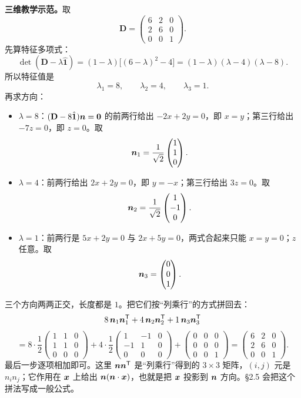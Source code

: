 \documentclass[11pt]{ctexart}
\newcommand{\ten}[1]{\mathbf{#1}}
\newcommand{\unitd}{\hat{\ten{1}}}
\begin{document}
\textbf{三维教学示范。}取
\[
\ten D=\begin{pmatrix}6&2&0\\2&6&0\\0&0&1\end{pmatrix}.
\]
先算特征多项式：
\[
\det(\ten D-\lambda\unitd)
=(1-\lambda)\bigl[(6-\lambda)^2-4\bigr]
=(1-\lambda)(\lambda-4)(\lambda-8).
\]
所以特征值是
\[
\lambda_1=8,\qquad \lambda_2=4,\qquad \lambda_3=1.
\]
再求方向：
\begin{itemize}[leftmargin=1.8em,itemsep=2pt]
\item $\lambda=8$：$(\ten D-8\unitd)\vect n=\vect0$ 的前两行给出 $-2x+2y=0$，即 $x=y$；第三行给出 $-7z=0$，即 $z=0$。取
\[
\boldsymbol{n}_1=\frac{1}{\sqrt2}\begin{pmatrix}1\\1\\0\end{pmatrix}.
\]
\item $\lambda=4$：前两行给出 $2x+2y=0$，即 $y=-x$；第三行给出 $3z=0$。取
\[
\boldsymbol{n}_2=\frac{1}{\sqrt2}\begin{pmatrix}1\\-1\\0\end{pmatrix}.
\]
\item $\lambda=1$：前两行是 $5x+2y=0$ 与 $2x+5y=0$，两式合起来只能 $x=y=0$；$z$ 任意。取
\[
\boldsymbol{n}_3=\begin{pmatrix}0\\0\\1\end{pmatrix}.
\]
\end{itemize}
三个方向两两正交，长度都是 $1$。把它们按“列乘行”的方式拼回去：
\[
8\,\boldsymbol{n}_1\boldsymbol{n}_1^{\mathsf T}
+4\,\boldsymbol{n}_2\boldsymbol{n}_2^{\mathsf T}
+1\,\boldsymbol{n}_3\boldsymbol{n}_3^{\mathsf T}
\]
\[
=8\cdot\frac12\begin{pmatrix}1&1&0\\1&1&0\\0&0&0\end{pmatrix}
+4\cdot\frac12\begin{pmatrix}1&-1&0\\-1&1&0\\0&0&0\end{pmatrix}
+\begin{pmatrix}0&0&0\\0&0&0\\0&0&1\end{pmatrix}
=\begin{pmatrix}6&2&0\\2&6&0\\0&0&1\end{pmatrix}.
\]
最后一步逐项相加即可。这里 $\boldsymbol{n}\boldsymbol{n}^{\mathsf T}$ 是“列乘行”得到的 $3\times3$ 矩阵，$(i,j)$ 元是 $n_in_j$；它作用在 $\boldsymbol{x}$ 上给出 $\boldsymbol{n}(\boldsymbol{n}\cdot\boldsymbol{x})$，也就是把 $\boldsymbol{x}$ 投影到 $\boldsymbol{n}$ 方向。\S2.5 会把这个拼法写成一般公式。
\end{document}
